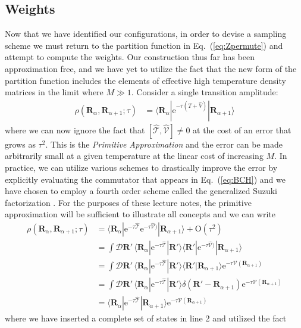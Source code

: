 \documentclass[prb,10pt,aps,floatfix,notitlepage]{revtex4-1}
\renewcommand{\vec}[1]{\boldsymbol{#1}}
\newcommand{\e}[1]{\mathrm{e}^{#1}}
\renewcommand{\eqref}[1]{Eq.~(\ref{#1})}
\newcommand{\R}{\vec{R}}
\newcommand{\T}{\mathcal{T}}
\begin{document}
\subsection{Weights}
Now that we have identified our configurations, in order to devise a sampling
scheme we must return to the partition function in \eqref{eq:Zpermute} and
attempt to compute the weights.  Our construction thus far has been
approximation free, and we have yet to utilize the fact that the new form of
the partition function includes the elements of effective high temperature
density matrices in the limit where $M \gg 1$. Consider a single transition
amplitude:
%
\begin{align}
\rho(\R_\alpha, \R_{\alpha+1}; \tau) &= \langle \R_\alpha | \e{-\tau(\hat{T} +
\hat{V})}|\R_{\alpha+1}\rangle
\end{align}
%
where we can now ignore the fact that $[\hat{\mathcal{T}},\hat{\mathcal{V}}]
\ne 0$ at the cost of an error that grows as $\tau^2$.  This is the
\emph{Primitive Approximation} and the error can be made arbitrarily small at a
given temperature at the linear cost of increasing $M$.  In practice, we can
utilize various schemes to drastically improve the error by explicitly
evaluating the commutator that appears in \eqref{eq:BCH} and we have chosen to 
employ a fourth order scheme called the generalized Suzuki factorization
\cite{Jang:2001cl}. For the purposes of these lecture notes, the primitive
approximation will be sufficient to illustrate all concepts and we can write
%
\begin{align}
    \rho(\R_\alpha, \R_{\alpha+1}; \tau) &= \langle \R_\alpha | 
    \e{-\tau\hat{\mathcal{T}}} \e{-\tau\hat{\mathcal{V}})}|\R_{\alpha+1}\rangle + \mathrm{O}(\tau^2)
\nonumber \\
&= \int \mathcal{D}\R'\, \langle \R_\alpha | 
\e{-\tau\hat{\T}}|\R'\rangle \langle \R' | \e{-\tau\hat{\mathcal{V}})}|\R_{\alpha+1}\rangle 
\nonumber \\
&= \int \mathcal{D}\R'\, \langle \R_\alpha | 
\e{-\tau\hat{\T}}|\R'\rangle \langle \R' |\R_{\alpha+1}\rangle \e{-\tau
\mathcal{V}(\R_{\alpha+1})} \nonumber \\
&= \int \mathcal{D}\R'\, \langle \R_\alpha | 
\e{-\tau\hat{\T}}|\R'\rangle \delta (\R'-\R_{\alpha+1}) \e{-\tau
\mathcal{V}(\R_{\alpha+1})} \nonumber \\
&=  \langle \R_\alpha | \e{-\tau\hat{\T}}|\R_{\alpha+1}\rangle  \e{-\tau
\mathcal{V}(\R_{\alpha+1})} 
\label{eq:rhoPrimitive}
\end{align}
%
where we have inserted a complete set of states in line 2 and utilized the fact
\end{document}
